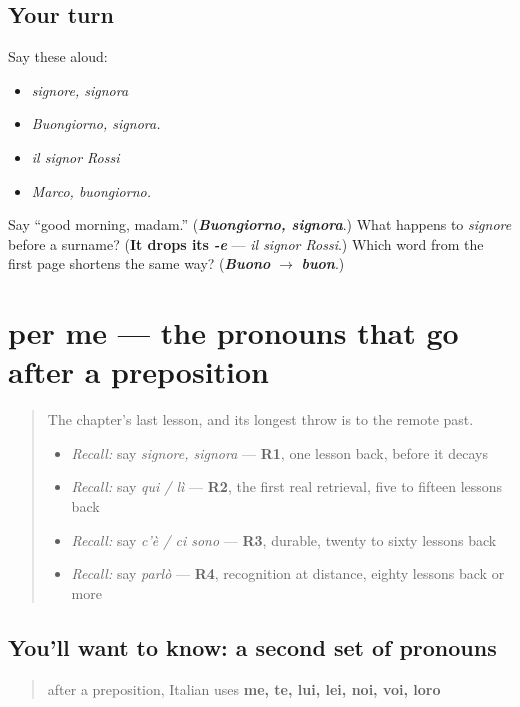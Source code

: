 \subsection*{Your turn}
Say these aloud:

\begin{itemize}
\raggedright
  \item \emph{signore, signora}
  \item \emph{Buongiorno, signora.}
  \item \emph{il signor Rossi}
  \item \emph{Marco, buongiorno.}
\end{itemize}

\begin{tcolorbox}[breakable,colback=teal!4,colframe=teal!35!black,title={Before you move on}]
Say \textquotedblleft{}good morning, madam.\textquotedblright{} (\emph{\textbf{Buongiorno, signora}}.) What happens to \emph{signore} before a surname? (\textbf{It drops its} \emph{\textbf{-e}} — \emph{il signor Rossi}.) Which word from the first page shortens the same way? (\emph{\textbf{Buono}} \textbf{$\to$} \emph{\textbf{buon}}.)
\end{tcolorbox}
\section[per me, a te]{per me — the pronouns that go after a preposition}

\label{lesson:IT-C34-per-me}



\begin{quote}
The chapter's last lesson, and its longest throw is to the remote past.

\begin{itemize}
\raggedright
  \item \emph{Recall:} say \emph{signore, signora} — \textbf{R1}, one lesson back, before it decays
  \item \emph{Recall:} say \emph{qui / lì} — \textbf{R2}, the first real retrieval, five to fifteen lessons back
  \item \emph{Recall:} say \emph{c'è / ci sono} — \textbf{R3}, durable, twenty to sixty lessons back
  \item \emph{Recall:} say \emph{parlò} — \textbf{R4}, recognition at distance, eighty lessons back or more
\end{itemize}
\end{quote}

\subsection*{You'll want to know: a second set of pronouns}
\begin{quote}
after a preposition, Italian uses \textbf{me, te, lui, lei, noi, voi, loro}
\end{quote}

